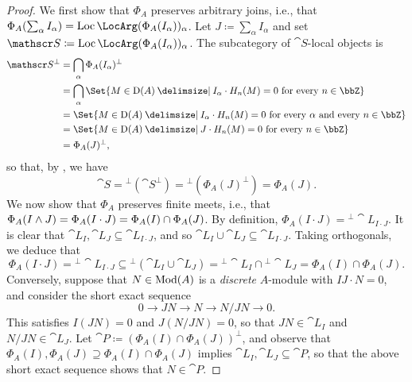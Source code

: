 \documentclass{amsart}
\begin{document}
    \begin{proof}
         We first show that $\Phi_A$ preserves arbitrary joins, i.e., that $\Phi_A(\sum_\alpha I_\alpha) = \Loc{(\Phi_A(I_{\alpha}))_{\alpha}}$. Let $J \coloneqq \sum_{\alpha} I_{\alpha}$ and set $\cat S \coloneqq \Loc{(\Phi_A(I_{\alpha}))_{\alpha}}$. The subcategory of $\cat S$-local objects is
    \[
    \begin{split}
    \cat S^\perp &=\bigcap_\alpha\Phi_A(I_\alpha)^\perp\\
    &= \bigcap_\alpha  \Set{M \in \Der(A) \given I_\alpha\cdot H_n(M)=0 \text{ for every }n\in\bbZ}\\
    &= \Set{M\in\Der(A) \given I_\alpha\cdot H_n(M)=0 \text{ for every }\alpha\text{ and every }n\in\bbZ}\\
    &= \Set{M\in \Der(A) \given  J\cdot H_n(M)=0\text{ for every }n\in\bbZ}\\
    &= \Phi_A(J)^\perp,
    \end{split}
    \]
    so that, by , we have
    \[
        \cat S={}^{\perp}(\cat S^\perp)
        ={}^{\perp}(\Phi_A(J)^\perp)
        =\Phi_A(J).
    \]
    We now show that $\Phi_A$ preserves finite meets, i.e., that $\Phi_A(I \land J) = \Phi_A(I \cdot J) = \Phi_A(I) \cap \Phi_A(J)$. By definition, $\Phi_A(I \cdot J) = {}^{\perp}\cat L_{I \cdot J}$. It is clear that $\cat L_I,\cat L_J \subseteq \cat L_{I \cdot J}$, and so $\cat L_I \cup \cat L_J \subseteq \cat L_{I \cdot J}$. Taking orthogonals, we deduce that
    \begin{equation}\label{eq:inclusion-1}
    \Phi_A(I \cdot J) = {}^{\perp} \cat L_{I \cdot J} \subseteq {}^{\perp}(\cat L_I \cup \cat L_J) = {}^{\perp}\cat L_I \cap {}^{\perp}\cat L_J = \Phi_A(I) \cap \Phi_A(J).
    \end{equation}
    Conversely, suppose that $N \in \operatorname{Mod}(A)$ is a \emph{discrete} $A$-module with $IJ \cdot N = 0$, and consider the short exact sequence 
    \[
    0 \to JN \to N \to N/JN \to 0.
    \]
    This satisfies $I(JN) = 0$ and $J(N/JN) = 0$, so that $JN \in \cat L_I$ and $N/JN \in \cat L_J$.  Let $\cat P \coloneqq (\Phi_A(I) \cap \Phi_A(J))^{\perp}$, and observe that $\Phi_A(I),\Phi_A(J) \supseteq \Phi_A(I) \cap \Phi_A(J)$ implies $\cat L_I,\cat L_J \subseteq \cat P$, so that the above short exact sequence shows that $N \in \cat P$. 


\end{proof}
\end{document}
